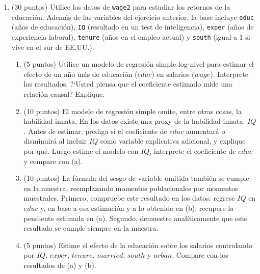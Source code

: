 \documentclass[letterpaper,11pt]{article}
\theoremstyle{plain}
\theoremstyle{definition}
\theoremstyle{remark}
\begin{document}
\begin{enumerate}
    \item (30 puntos) Utilice los datos de \texttt{wage2} para estudiar los retornos de
        la educaci\'on. Adem\'as de las variables del ejercicio anterior, la base incluye
        \texttt{educ} (a\~nos de educaci\'on), \texttt{IQ} (resultado en un test de
        inteligencia), \texttt{exper} (a\~nos de experiencia laboral), \texttt{tenure} (a\~nos
        en el empleo actual) y \texttt{south} (igual a 1 si vive en el sur de EE.UU.).
        \begin{enumerate}
            \item (5 puntos) Utilice un modelo de regresi\'on simple log-nivel para estimar el
                efecto de un a\~no m\'as de educaci\'on ($educ$) en salarios ($wage$). Interprete
                los resultados. ?`Usted piensa que el coeficiente estimado mide una relaci\'on
                causal? Explique.
            \item (10 puntos) El modelo de regresi\'on simple omite, entre otras cosas, la
                habilidad innata. En los datos existe una proxy de la habilidad innata: $IQ$.
                Antes de estimar, prediga si el coeficiente de $educ$ aumentar\'a o
                disminuir\'a al incluir $IQ$ como variable explicativa adicional, y explique por
                qu\'e. Luego estime el modelo con $IQ$, interprete el coeficiente de $educ$ y
                compare con (a).
            \item (10 puntos) La f\'ormula del sesgo de variable omitida tambi\'en se cumple en
                la muestra, reemplazando momentos poblacionales por momentos muestrales. Primero,
                compruebe este resultado en los datos: regrese $IQ$ en $educ$ y, en base a esa
                estimaci\'on y a lo obtenido en (b), recupere la pendiente estimada en (a).
                Segundo, demuestre anal\'iticamente que este resultado se cumple siempre en la
                muestra.
            \item (5 puntos) Estime el efecto de la educaci\'on sobre los salarios controlando
                por $IQ$, $exper$, $tenure$, $married$, $south$ y $urban$. Compare con los
                resultados de (a) y (b).
        \end{enumerate}


\end{enumerate}
\end{document}
